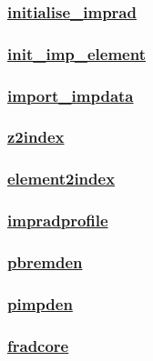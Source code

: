 \documentclass[]{article}
\begin{document}
\subsubsection{\texorpdfstring{\href{initialise_imprad.html}{initialise\_imprad}}{initialise\_imprad}}\label{initialise_imprad}

\subsubsection{\texorpdfstring{\href{init_imp_element.html}{init\_imp\_element}}{init\_imp\_element}}\label{init_imp_element}

\subsubsection{\texorpdfstring{\href{import_impdata.html}{import\_impdata}}{import\_impdata}}\label{import_impdata}

\subsubsection{\texorpdfstring{\href{z2index.html}{z2index}}{z2index}}\label{z2index}

\subsubsection{\texorpdfstring{\href{element2index.html}{element2index}}{element2index}}\label{element2index}

\subsubsection{\texorpdfstring{\href{impradprofile.html}{impradprofile}}{impradprofile}}\label{impradprofile}

\subsubsection{\texorpdfstring{\href{pbremden.html}{pbremden}}{pbremden}}\label{pbremden}

\subsubsection{\texorpdfstring{\href{pimpden.html}{pimpden}}{pimpden}}\label{pimpden}

\subsubsection{\texorpdfstring{\href{fradcore.html}{fradcore}}{fradcore}}\label{fradcore}
\end{document}
